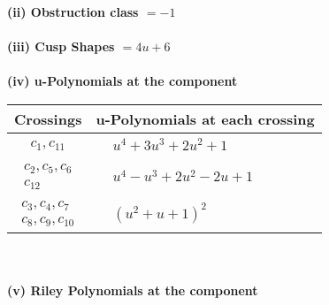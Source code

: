\documentclass[1p]{elsarticle_modified}
\theoremstyle{definition}
\begin{document}
\flushleft \textbf{(ii) Obstruction class $= -1$}\\~\\
\flushleft \textbf{(iii) Cusp Shapes $= 4 u+6$}\\~\\
\newpage\renewcommand{\arraystretch}{1}
\flushleft \textbf{(iv) u-Polynomials at the component}\newline \\
\begin{tabular}{m{50pt}|m{274pt}}
Crossings & \hspace{64pt}u-Polynomials at each crossing \\
\hline $$\begin{aligned}c_{1},c_{11}\end{aligned}$$&$\begin{aligned}
&u^4+3 u^3+2 u^2+1
\end{aligned}$\\
\hline $$\begin{aligned}c_{2},c_{5},c_{6}\\c_{12}\end{aligned}$$&$\begin{aligned}
&u^4- u^3+2 u^2-2 u+1
\end{aligned}$\\
\hline $$\begin{aligned}c_{3},c_{4},c_{7}\\c_{8},c_{9},c_{10}\end{aligned}$$&$\begin{aligned}
&(u^2+u+1)^2
\end{aligned}$\\
\hline
\end{tabular}\\~\\
\newpage\renewcommand{\arraystretch}{1}
\flushleft \textbf{(v) Riley Polynomials at the component}\newline \\
\end{document}
